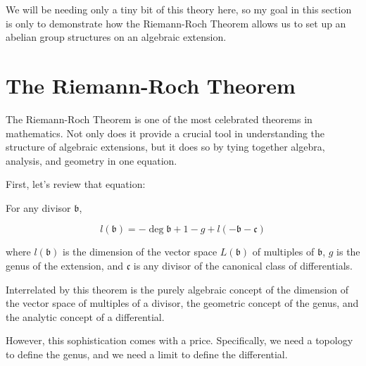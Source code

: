 We will be needing only a tiny bit of this theory here, so my goal in
this section is only to demonstrate how the Riemann-Roch Theorem
allows us to set up an abelian group structures on an algebraic
extension.

\section{The Riemann-Roch Theorem}

The Riemann-Roch Theorem is one of the most celebrated theorems in
mathematics.  Not only does it provide a crucial tool in understanding
the structure of algebraic extensions, but it does so by tying
together algebra, analysis, and geometry in one equation.

First, let's review that equation:


% 
% 

For any divisor $\mathfrak{b}$,


$$l(\mathfrak{b}) = - \deg \mathfrak{b} + 1 - g + l(-\mathfrak{b}-\mathfrak{c}) $$

where $l(\mathfrak{b})$ is the dimension of the vector space
$L(\mathfrak{b})$ of multiples of $\mathfrak{b}$, $g$ is the genus of
the extension, and $\mathfrak{c}$ is any divisor of the canonical class of
differentials.

\endtheorem

Interrelated by this theorem is the purely algebraic concept of the
dimension of the vector space of multiples of a divisor, the geometric
concept of the genus, and the analytic concept of a differential.

However, this sophistication comes with a price.  Specifically, we
need a topology to define the genus, and we need a limit to define the
differential.

